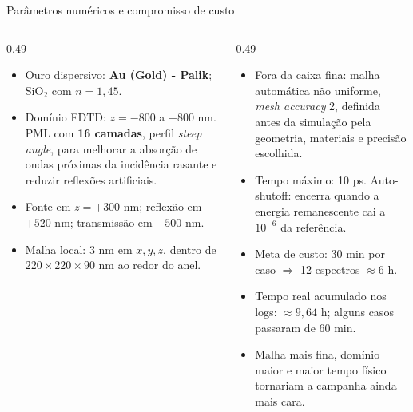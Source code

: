 \documentclass[aspectratio=169,10pt]{beamer}
\begin{document}
\begin{frame}{Parâmetros numéricos e compromisso de custo}
\begin{columns}[T,onlytextwidth]
  \begin{column}{0.49\textwidth}
    \small
    \begin{itemize}\setlength\itemsep{0.48em}
      \item Ouro dispersivo: \textbf{Au (Gold) - Palik}; SiO$_2$ com $n=1{,}45$.
      \item Domínio FDTD: $z=-800$ a $+800$ nm. PML com \textbf{16 camadas}, perfil \emph{steep angle}, para melhorar a absorção de ondas próximas da incidência rasante e reduzir reflexões artificiais.
      \item Fonte em $z=+300$ nm; reflexão em $+520$ nm; transmissão em $-500$ nm.
      \item Malha local: $3$ nm em $x,y,z$, dentro de $220\times220\times90$ nm ao redor do anel.
    \end{itemize}
  \end{column}
  \begin{column}{0.49\textwidth}
    \small
    \begin{itemize}\setlength\itemsep{0.48em}
      \item Fora da caixa fina: malha automática não uniforme, \emph{mesh accuracy} 2, definida antes da simulação pela geometria, materiais e precisão escolhida.
      \item Tempo máximo: 10 ps. Auto-shutoff: encerra quando a energia remanescente cai a $10^{-6}$ da referência.
      \item Meta de custo: 30 min por caso $\Rightarrow$ 12 espectros $\approx 6$ h.
      \item Tempo real acumulado nos logs: \alert{$\approx 9{,}64$ h}; alguns casos passaram de 60 min.
      \item Malha mais fina, domínio maior e maior tempo físico tornariam a campanha ainda mais cara.
    \end{itemize}
  \end{column}
\end{columns}
\end{frame}
\end{document}
